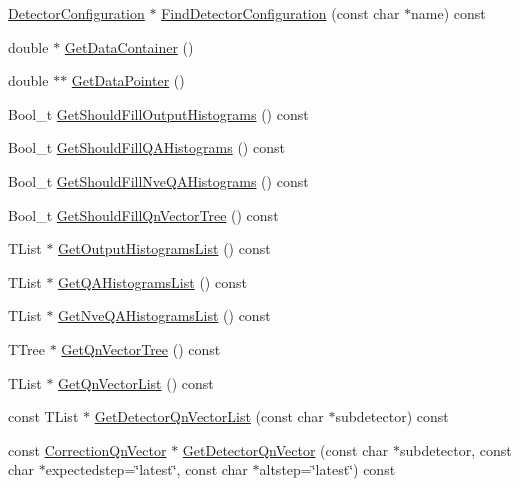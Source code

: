 \begin{DoxyCompactItemize}
\item 
\mbox{\hyperlink{classQn_1_1DetectorConfiguration}{Detector\+Configuration}} $\ast$ \mbox{\hyperlink{classQn_1_1CorrectionCalculator_a0bc04e4ee0d401f3336cce67089cfbd7}{Find\+Detector\+Configuration}} (const char $\ast$name) const
\item 
double $\ast$ \mbox{\hyperlink{classQn_1_1CorrectionCalculator_aee791a60fb690d80912719312abb2a15}{Get\+Data\+Container}} ()
\item 
double $\ast$$\ast$ \mbox{\hyperlink{classQn_1_1CorrectionCalculator_a9234784d26c9658bf2da7052f7652ebb}{Get\+Data\+Pointer}} ()
\item 
Bool\+\_\+t \mbox{\hyperlink{classQn_1_1CorrectionCalculator_a1c3dca90ca901753f71f95cfea0473de}{Get\+Should\+Fill\+Output\+Histograms}} () const
\item 
Bool\+\_\+t \mbox{\hyperlink{classQn_1_1CorrectionCalculator_a9ccaff2f7d4e3b7d5f7badfc6e904b91}{Get\+Should\+Fill\+Q\+A\+Histograms}} () const
\item 
Bool\+\_\+t \mbox{\hyperlink{classQn_1_1CorrectionCalculator_aa36a55165d5992bf626705df5bc4c992}{Get\+Should\+Fill\+Nve\+Q\+A\+Histograms}} () const
\item 
Bool\+\_\+t \mbox{\hyperlink{classQn_1_1CorrectionCalculator_aeb441a15ddd2c239a7f1d1fa1c9d5021}{Get\+Should\+Fill\+Qn\+Vector\+Tree}} () const
\item 
T\+List $\ast$ \mbox{\hyperlink{classQn_1_1CorrectionCalculator_ab09eb2913769e2624959d2edafe2c608}{Get\+Output\+Histograms\+List}} () const
\item 
T\+List $\ast$ \mbox{\hyperlink{classQn_1_1CorrectionCalculator_abae9945e1ce19dc5f02840ba7b254ac4}{Get\+Q\+A\+Histograms\+List}} () const
\item 
T\+List $\ast$ \mbox{\hyperlink{classQn_1_1CorrectionCalculator_a6fadf124a9086811170938d32c7e7ded}{Get\+Nve\+Q\+A\+Histograms\+List}} () const
\item 
T\+Tree $\ast$ \mbox{\hyperlink{classQn_1_1CorrectionCalculator_adf1e27092d3097725f051716bf3205d8}{Get\+Qn\+Vector\+Tree}} () const
\item 
T\+List $\ast$ \mbox{\hyperlink{classQn_1_1CorrectionCalculator_adf7ecbc252f8265d0dcd11aa9bdc01db}{Get\+Qn\+Vector\+List}} () const
\item 
const T\+List $\ast$ \mbox{\hyperlink{classQn_1_1CorrectionCalculator_aefeaabf638391df34dba7527ac11302c}{Get\+Detector\+Qn\+Vector\+List}} (const char $\ast$subdetector) const
\item 
const \mbox{\hyperlink{classQn_1_1CorrectionQnVector}{Correction\+Qn\+Vector}} $\ast$ \mbox{\hyperlink{classQn_1_1CorrectionCalculator_acc68a2a755636f395fe0baaff56e19d9}{Get\+Detector\+Qn\+Vector}} (const char $\ast$subdetector, const char $\ast$expectedstep=\char`\"{}latest\char`\"{}, const char $\ast$altstep=\char`\"{}latest\char`\"{}) const
$$
\end{DoxyCompactItemize}
